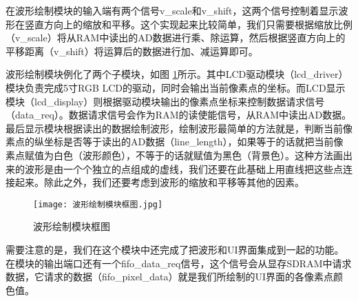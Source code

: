 \documentclass[lang=cn,a4paper,newtx]{elegantpaper}
\begin{document}
在波形绘制模块的输入端有两个信号v\_scale和v\_shift，这两个信号控制着显示波形在竖直方向上的缩放和平移。这个实现起来比较简单，我们只需要根据缩放比例（v\_scale）将从RAM中读出的AD数据进行乘、除运算，然后根据竖直方向上的平移距离（v\_shift）将运算后的数据进行加、减运算即可。

波形绘制模块例化了两个子模块，如图 \ref{波形绘制模块框图}所示。其中LCD驱动模块（lcd\_driver）模块负责完成5寸RGB LCD的驱动，同时会输出当前像素点的坐标。而LCD显示模块（lcd\_display）则根据驱动模块输出的像素点坐标来控制数据请求信号（data\_req）。数据请求信号会作为RAM的读使能信号，从RAM中读出AD数据。最后显示模块根据读出的数据绘制波形，绘制波形最简单的方法就是，判断当前像素点的纵坐标是否等于读出的AD数据（line\_length），如果等于的话就把当前像素点赋值为白色（波形颜色），不等于的话就赋值为黑色（背景色）。这种方法画出来的波形是由一个个独立的点组成的虚线，我们还要在此基础上用直线把这些点连接起来。除此之外，我们还要考虑到波形的缩放和平移等其他的因素。
  \begin{figure}[!htb]
	\centering
	\caption{波形绘制模块框图}
	\label{波形绘制模块框图}
	\texttt{[image: 波形绘制模块框图.jpg]}
\end{figure}

需要注意的是，我们在这个模块中还完成了把波形和UI界面集成到一起的功能。在模块的输出端口还有一个fifo\_data\_req信号，这个信号会从显存SDRAM中请求数据，它请求的数据（fifo\_pixel\_data）就是我们所绘制的UI界面的各像素点颜色值。
\end{document}
